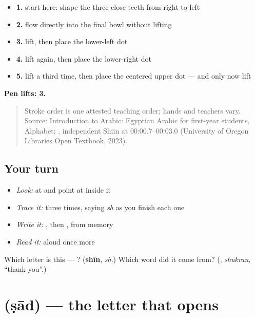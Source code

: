 \begin{itemize}
\raggedright
  \item \textbf{1.} start here: shape the three close teeth from right to left
  \item \textbf{2.} flow directly into the final bowl without lifting
  \item \textbf{3.} lift, then place the lower-left dot
  \item \textbf{4.} lift again, then place the lower-right dot
  \item \textbf{5.} lift a third time, then place the centered upper dot — and only now lift
\end{itemize}

\textbf{Pen lifts: 3.}

\begin{quote}
Stroke order is one attested teaching order; hands and teachers vary. Source: Introduction to Arabic: Egyptian Arabic for first-year students, Alphabet:    , independent Shiin at 00:00.7–00:03.0 (University of Oregon Libraries Open Textbook, 2023).
\end{quote}

\subsection*{Your turn}
\begin{itemize}
\raggedright
  \item \emph{Look:} at \textbf{} and point at  inside it
  \item \emph{Trace it:}  three times, saying \emph{sh} as you finish each one
  \item \emph{Write it:} , then , from memory
  \item \emph{Read it:} \textbf{} aloud once more
\end{itemize}

\begin{tcolorbox}[breakable,colback=teal!4,colframe=teal!35!black,title={Before you move on}]
Which letter is this — ? (\textbf{shīn}, \emph{sh}.) Which word did it come from? (\textbf{}, \emph{shukran}, \textquotedblleft{}thank you\textquotedblright{}.)
\end{tcolorbox}
\section[\texorpdfstring{\ar{ص} (ṣād)}{ص (ṣād)}]{ (ṣād) — the letter that opens }

